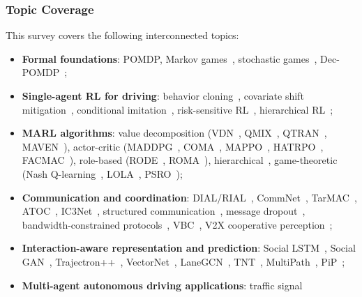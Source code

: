 \documentclass[12pt, a4paper]{article}
\begin{document}
\subsubsection*{Topic Coverage}
This survey covers the following interconnected topics:
\begin{itemize}[noitemsep]
  \item \textbf{Formal foundations}: POMDP, Markov games~\cite{littman1994markov},
        stochastic games~\cite{shapley1953stochastic},
        Dec-POMDP~\cite{bernstein2002complexity};
  \item \textbf{Single-agent RL for driving}: behavior cloning~\cite{bojarski2016end},
        covariate shift mitigation~\cite{bansal2018chauffeur},
        conditional imitation~\cite{codevilla2018end},
        risk-sensitive RL~\cite{kahn2017uncertainty},
        hierarchical RL~\cite{chen2019model};
  \item \textbf{MARL algorithms}: value decomposition
        (VDN~\cite{sunehag2018value}, QMIX~\cite{rashid2018qmix},
        QTRAN~\cite{son2019qtran}, MAVEN~\cite{mahajan2019maven}),
        actor-critic (MADDPG~\cite{lowe2017multi},
        COMA~\cite{foerster2018counterfactual},
        MAPPO~\cite{yu2021surprising}, HATRPO~\cite{kuba2021hatrpo},
        FACMAC~\cite{peng2021facmac}),
        role-based (RODE~\cite{wang2021rode}, ROMA~\cite{wang2020roma}),
        hierarchical~\cite{vezhnevets2017feudal,chu2020multi},
        game-theoretic (Nash Q-learning~\cite{hu2003nash},
        LOLA~\cite{foerster2018lola}, PSRO~\cite{lanctot2017unified});
  \item \textbf{Communication and coordination}: DIAL/RIAL~\cite{foerster2016learning},
        CommNet~\cite{sukhbaatar2016learning},
        TarMAC~\cite{das2019tarmac},
        ATOC~\cite{jiang2018learning},
        IC3Net~\cite{singh2019learning},
        structured communication~\cite{kim2019learning},
        message dropout~\cite{kim2019message},
        bandwidth-constrained protocols~\cite{wang2020bandwidth},
        VBC~\cite{wang2021vbc},
        V2X cooperative perception~\cite{wang2020v2vnet};
  \item \textbf{Interaction-aware representation and prediction}: Social
        LSTM~\cite{alahi2016social}, Social GAN~\cite{gupta2018social},
        Trajectron++~\cite{salzmann2020trajectron},
        VectorNet~\cite{gao2020vectornet}, LaneGCN~\cite{liang2020lanegcn},
        TNT~\cite{zhao2020tnt}, MultiPath~\cite{chai2019multipath},
        PiP~\cite{song2020pip};
  \item \textbf{Multi-agent autonomous driving applications}: traffic signal

\end{itemize}
\end{document}
